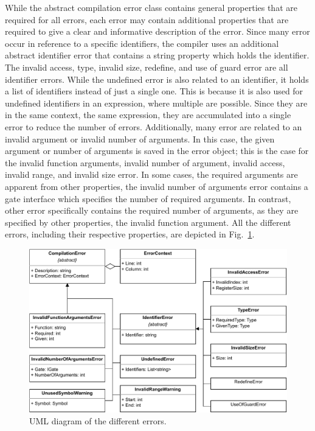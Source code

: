 While the abstract compilation error class contains general properties that are required for all errors, each error may contain additional properties that are required to give a clear and informative description of the error. Since many error occur in reference to a specific identifiers, the compiler uses an additional abstract identifier error that contains a string property which holds the identifier. The invalid access, type, invalid size, redefine, and use of guard error are all identifier errors. While the undefined error is also related to an identifier, it holds a list of identifiers instead of just a single one. This is because it is also used for undefined identifiers in an expression, where multiple are possible. Since they are in the same context, \ie the same expression, they are accumulated into a single error to reduce the number of errors. Additionally, many error are related to an invalid argument or invalid number of arguments. In this case, the given argument or number of arguments is saved in the error object; this is the case for the invalid function arguments, invalid number of argument, invalid access, invalid range, and invalid size error. In some cases, the required arguments are apparent from other properties, \eg the invalid number of arguments error contains a gate interface which specifies the number of required arguments. In contrast, other error specifically contains the required number of arguments, as they are specified by other properties, \eg the invalid function argument. All the different errors, including their respective properties, are depicted in Fig.~\ref{fig:implementation_uml_errors}.

\begin{figure}[htp]
    \centering
    \includegraphics[width=.9\textwidth]{../figures/uml_errors.pdf}
    \caption{UML diagram of the different errors.}
    \label{fig:implementation_uml_errors}
\end{figure}

